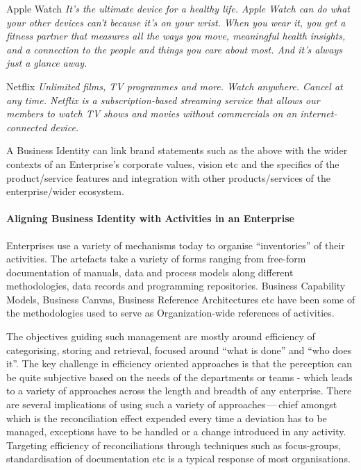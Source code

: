 \begin{basedescript}{%
    \desclabelstyle{\multilinelabel}
    \desclabelwidth{2.6cm}
}
    \item[Apple Watch] 
                       \textit{It’s the ultimate device for a healthy life.
                       Apple Watch can do what your other devices can't because it's on your wrist.
                       When you wear it, you get a fitness partner that measures all the ways you move,
                       meaningful health insights, and a connection to the people and things you care about most.
                       And it's always just a glance away.}
    \item[Netflix]     
                       \textit{Unlimited films, TV programmes and more. Watch anywhere. Cancel at any time.
                       Netflix is a subscription-based streaming service that allows our members to watch TV shows
                       and movies without commercials on an internet-connected device.}
\end{basedescript}

A Business Identity can link brand statements such as the above with the wider contexts of an
Enterprise’s corporate values, vision etc and the specifics of the product/service features and
integration with other products/services of the enterprise/wider ecosystem.

\paragraph*{Aligning Business Identity with Activities in an Enterprise}

Enterprises use a variety of mechanisms today to organise “inventories” of their activities.
The artefacts take a variety of forms ranging from free-form documentation of manuals,
data and process models along different methodologies, data records and programming repositories.
Business Capability Models, Business Canvas, Business Reference Architectures etc have been some of the
methodologies used to serve as Organization-wide references of activities.

The objectives guiding such management are mostly around efficiency of categorising, storing and retrieval,
focused around “what is done” and “who does it”.
The key challenge in efficiency oriented approaches is that the perception can be quite subjective based
on the needs of the departments or teams - which leads to a variety of approaches across the length and
breadth of any enterprise.
There are several implications of using such a variety of approaches\,---\,chief amongst which is the
reconciliation effect expended every time a deviation has to be managed,
exceptions have to be handled or a change introduced in any activity.
Targeting efficiency of reconciliations through techniques such as focus-groups, standardisation of documentation etc
is a typical response of most organisations.

